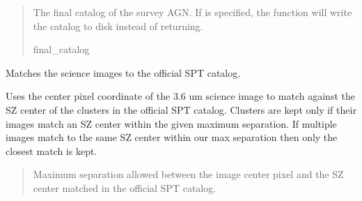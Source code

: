 \documentclass[letterpaper,12pt,english]{sphinxmanual}
\begin{document}
\begin{fulllineitems}
\begin{fulllineitems}
\begin{quote}
\begin{description}
\begin{itemize}
\end{itemize}

\sphinxAtStartPar
The final catalog of the survey AGN. If  is specified, the function will write the catalog to disk
instead of returning.

\sphinxAtStartPar
final\_catalog

\end{description}\end{quote}

\end{fulllineitems}


\begin{fulllineitems}
\label{\detokenize{api/selector:SPTclIRAGN.Pipeline_functions.SelectIRAGN.image_to_catalog_match}}
\pysigstartsignatures
{}
\pysigstopsignatures
\sphinxAtStartPar
Matches the science images to the official SPT catalog.

\sphinxAtStartPar
Uses the center pixel coordinate of the 3.6 um science image to match against the SZ center of the
clusters in the official SPT catalog. Clusters are kept only if their images match an SZ center within the given
maximum separation. If multiple images match to the same SZ center within our max separation then only the
closest match is kept.
\begin{quote}\begin{description}
\sphinxAtStartPar
{} \textendash{} Maximum separation allowed between the image center pixel and the SZ center matched in the official SPT
catalog.

\end{description}\end{quote}

\end{fulllineitems}



\end{fulllineitems}
\end{document}
